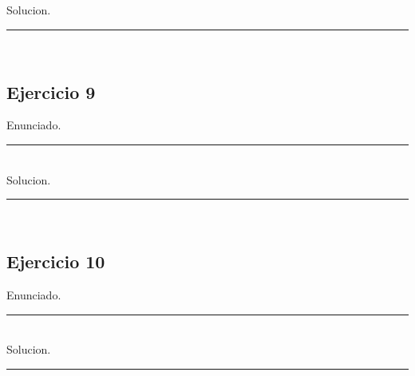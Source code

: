 Solucion.

\rule{\textwidth}{0.1pt} \\[2pt]


\subsection{Ejercicio 9} 

Enunciado.

\rule{\textwidth}{0.1pt} \\[2pt]

Solucion.

\rule{\textwidth}{0.1pt} \\[2pt]


\subsection{Ejercicio 10} 

Enunciado.

\rule{\textwidth}{0.1pt} \\[2pt]

Solucion.

\rule{\textwidth}{0.1pt} \\[2pt]
